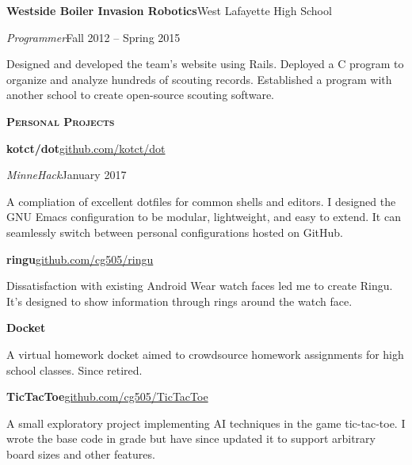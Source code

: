 \documentclass[11pt]{article}
\newcommand{\sectionfont}{\Large\scshape\bfseries\color{cg505green}}
\begin{document}
\begin{minipage}[t]{0.67\textwidth}
  \textbf{Westside Boiler Invasion Robotics}\hfill West Lafayette High School
  \begin{adjustwidth}{10pt}{}
    \emph{Programmer}\hfill Fall 2012 -- Spring 2015

    Designed and developed the team's website using Rails.
    Deployed a C program to organize and analyze hundreds of scouting records.
    Established a program with another school to create open-source scouting software.
  \end{adjustwidth}

  \vspace{5pt}

  {\sectionfont Personal Projects}

  \textbf{kotct/dot}\hfill\href{https://github.com/kotct/dot/}{github.com/kotct/dot}
  \begin{adjustwidth}{10pt}{}
    \emph{MinneHack}\hfill January 2017

    A compliation of excellent dotfiles for common shells and editors.
    I designed the GNU Emacs configuration to be modular, lightweight, and easy to extend.
    It can seamlessly switch between personal configurations hosted on GitHub.
  \end{adjustwidth}

  \textbf{ringu}\hfill\href{https://github.com/cg505/ringu/}{github.com/cg505/ringu}
  \begin{adjustwidth}{10pt}{}
    Dissatisfaction with existing Android Wear watch faces led me to create Ringu.
    It's designed to show information through rings around the watch face.
  \end{adjustwidth}

  \textbf{Docket}
  \begin{adjustwidth}{10pt}{}
    A virtual homework docket aimed to crowdsource homework assignments for high school classes.
    Since retired.
  \end{adjustwidth}

  \textbf{TicTacToe}\hfill\href{https://github.com/cg505/TicTacToe/}{github.com/cg505/TicTacToe}
  \begin{adjustwidth}{10pt}{}
    A small exploratory project implementing AI techniques in the game tic-tac-toe.
    I wrote the base code in  grade but have since updated it to support arbitrary board sizes and other features.
  \end{adjustwidth}
\end{minipage}
\end{document}
